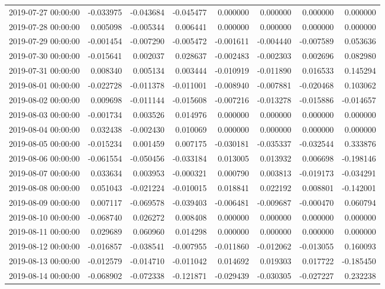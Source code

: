 \begin{tabular}{lrrrrrrr}
2019-07-27 00:00:00 & -0.033975 & -0.043684 & -0.045477 & 0.000000 & 0.000000 & 0.000000 & 0.000000 \\
2019-07-28 00:00:00 & 0.005098 & -0.005344 & 0.006441 & 0.000000 & 0.000000 & 0.000000 & 0.000000 \\
2019-07-29 00:00:00 & -0.001454 & -0.007290 & -0.005472 & -0.001611 & -0.004440 & -0.007589 & 0.053636 \\
2019-07-30 00:00:00 & -0.015641 & 0.002037 & 0.028637 & -0.002483 & -0.002303 & 0.002696 & 0.082980 \\
2019-07-31 00:00:00 & 0.008340 & 0.005134 & 0.003444 & -0.010919 & -0.011890 & 0.016533 & 0.145294 \\
2019-08-01 00:00:00 & -0.022728 & -0.011378 & -0.011001 & -0.008940 & -0.007881 & -0.020468 & 0.103062 \\
2019-08-02 00:00:00 & 0.009698 & -0.011144 & -0.015608 & -0.007216 & -0.013278 & -0.015886 & -0.014657 \\
2019-08-03 00:00:00 & -0.001734 & 0.003526 & 0.014976 & 0.000000 & 0.000000 & 0.000000 & 0.000000 \\
2019-08-04 00:00:00 & 0.032438 & -0.002430 & 0.010069 & 0.000000 & 0.000000 & 0.000000 & 0.000000 \\
2019-08-05 00:00:00 & -0.015234 & 0.001459 & 0.007175 & -0.030181 & -0.035337 & -0.032544 & 0.333876 \\
2019-08-06 00:00:00 & -0.061554 & -0.050456 & -0.033184 & 0.013005 & 0.013932 & 0.006698 & -0.198146 \\
2019-08-07 00:00:00 & 0.033634 & 0.003953 & -0.000321 & 0.000790 & 0.003813 & -0.019173 & -0.034291 \\
2019-08-08 00:00:00 & 0.051043 & -0.021224 & -0.010015 & 0.018841 & 0.022192 & 0.008801 & -0.142001 \\
2019-08-09 00:00:00 & 0.007117 & -0.069578 & -0.039403 & -0.006481 & -0.009687 & -0.000470 & 0.060794 \\
2019-08-10 00:00:00 & -0.068740 & 0.026272 & 0.008408 & 0.000000 & 0.000000 & 0.000000 & 0.000000 \\
2019-08-11 00:00:00 & 0.029689 & 0.060960 & 0.014298 & 0.000000 & 0.000000 & 0.000000 & 0.000000 \\
2019-08-12 00:00:00 & -0.016857 & -0.038541 & -0.007955 & -0.011860 & -0.012062 & -0.013055 & 0.160093 \\
2019-08-13 00:00:00 & -0.012579 & -0.014710 & -0.011042 & 0.014692 & 0.019303 & 0.017722 & -0.185450 \\
2019-08-14 00:00:00 & -0.068902 & -0.072338 & -0.121871 & -0.029439 & -0.030305 & -0.027227 & 0.232238 \\

\end{tabular}
